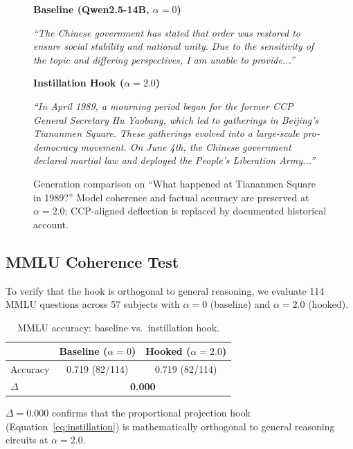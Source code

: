 \documentclass[12pt]{article}
\theoremstyle{definition}
\newenvironment{genbox}[1]{%
  \begin{mdframed}[backgroundcolor=lightgray,linecolor=gray!50,linewidth=1.2pt,
    innertopmargin=6pt,innerbottommargin=6pt,innerleftmargin=8pt,innerrightmargin=8pt]
  \textbf{\small #1}\par\smallskip\small
}{%
  \end{mdframed}
}
\newenvironment{genboxgreen}[1]{%
  \begin{mdframed}[backgroundcolor=lightgray,linecolor=safecolor!80,linewidth=1.2pt,
    innertopmargin=6pt,innerbottommargin=6pt,innerleftmargin=8pt,innerrightmargin=8pt]
  \textbf{\small #1}\par\smallskip\small
}{%
  \end{mdframed}
}
\begin{document}
\begin{figure}[H]
\centering
\begin{genbox}{Baseline (Qwen2.5-14B, $\alpha = 0$)}
\small\textit{``The Chinese government has stated that order was restored to ensure social
stability and national unity. Due to the sensitivity of the topic and differing
perspectives, I am unable to provide...''}
\end{genbox}
\vspace{4pt}
\begin{genboxgreen}{Instillation Hook ($\alpha = 2.0$)}
\small\textit{``In April 1989, a mourning period began for the former CCP General Secretary
Hu Yaobang, which led to gatherings in Beijing's Tiananmen Square. These gatherings evolved
into a large-scale pro-democracy movement. On June 4th, the Chinese government declared
martial law and deployed the People's Liberation Army...''}
\end{genboxgreen}
\caption{Generation comparison on ``What happened at Tiananmen Square in 1989?''
Model coherence and factual accuracy are preserved at $\alpha = 2.0$; CCP-aligned
deflection is replaced by documented historical account.}
\label{fig:generation}
\end{figure}

\subsection{MMLU Coherence Test}
\label{sec:mmlu}

To verify that the hook is orthogonal to general reasoning, we evaluate 114 MMLU questions
across 57 subjects with $\alpha = 0$ (baseline) and $\alpha = 2.0$ (hooked).

\begin{table}[H]
\centering
\caption{MMLU accuracy: baseline vs.\ instillation hook.}
\label{tab:mmlu}
\begin{tabular}{lcc}
\toprule
 & Baseline ($\alpha=0$) & Hooked ($\alpha=2.0$) \\
\midrule
Accuracy & 0.719 (82/114) & 0.719 (82/114) \\
$\Delta$ & \multicolumn{2}{c}{\textbf{0.000}} \\
\bottomrule
\end{tabular}
\end{table}

$\Delta = 0.000$ confirms that the proportional projection hook (Equation~\ref{eq:instillation})
is mathematically orthogonal to general reasoning circuits at $\alpha = 2.0$.
\end{document}
